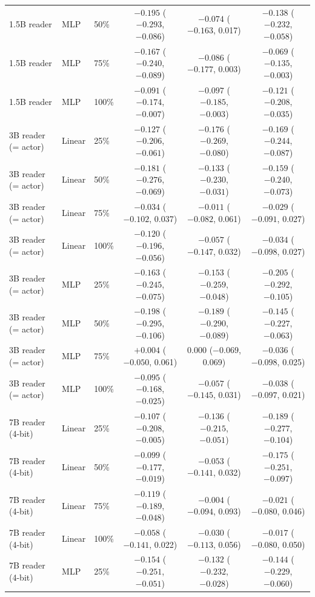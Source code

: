 \documentclass[11pt]{article}
\begin{document}
\begin{table}[h]
\begin{tabular}{@{}lllccc@{}}
1.5B reader & MLP & 50\% & $-0.195$ ($-0.293$, $-0.086$) & $-0.074$ ($-0.163$, 0.017) & $-0.138$ ($-0.232$, $-0.058$) \\
1.5B reader & MLP & 75\% & $-0.167$ ($-0.240$, $-0.089$) & $-0.086$ ($-0.177$, 0.003) & $-0.069$ ($-0.135$, $-0.003$) \\
1.5B reader & MLP & 100\% & $-0.091$ ($-0.174$, $-0.007$) & $-0.097$ ($-0.185$, $-0.003$) & $-0.121$ ($-0.208$, $-0.035$) \\
3B reader (= actor) & Linear & 25\% & $-0.127$ ($-0.206$, $-0.061$) & $-0.176$ ($-0.269$, $-0.080$) & $-0.169$ ($-0.244$, $-0.087$) \\
3B reader (= actor) & Linear & 50\% & $-0.181$ ($-0.276$, $-0.069$) & $-0.133$ ($-0.230$, $-0.031$) & $-0.159$ ($-0.240$, $-0.073$) \\
3B reader (= actor) & Linear & 75\% & $-0.034$ ($-0.102$, 0.037) & $-0.011$ ($-0.082$, 0.061) & $-0.029$ ($-0.091$, 0.027) \\
3B reader (= actor) & Linear & 100\% & $-0.120$ ($-0.196$, $-0.056$) & $-0.057$ ($-0.147$, 0.032) & $-0.034$ ($-0.098$, 0.027) \\
3B reader (= actor) & MLP & 25\% & $-0.163$ ($-0.245$, $-0.075$) & $-0.153$ ($-0.259$, $-0.048$) & $-0.205$ ($-0.292$, $-0.105$) \\
3B reader (= actor) & MLP & 50\% & $-0.198$ ($-0.295$, $-0.106$) & $-0.189$ ($-0.290$, $-0.089$) & $-0.145$ ($-0.227$, $-0.063$) \\
3B reader (= actor) & MLP & 75\% & $+0.004$ ($-0.050$, 0.061) & 0.000 ($-0.069$, 0.069) & $-0.036$ ($-0.098$, 0.025) \\
3B reader (= actor) & MLP & 100\% & $-0.095$ ($-0.168$, $-0.025$) & $-0.057$ ($-0.145$, 0.031) & $-0.038$ ($-0.097$, 0.021) \\
7B reader (4-bit) & Linear & 25\% & $-0.107$ ($-0.208$, $-0.005$) & $-0.136$ ($-0.215$, $-0.051$) & $-0.189$ ($-0.277$, $-0.104$) \\
7B reader (4-bit) & Linear & 50\% & $-0.099$ ($-0.177$, $-0.019$) & $-0.053$ ($-0.141$, 0.032) & $-0.175$ ($-0.251$, $-0.097$) \\
7B reader (4-bit) & Linear & 75\% & $-0.119$ ($-0.189$, $-0.048$) & $-0.004$ ($-0.094$, 0.093) & $-0.021$ ($-0.080$, 0.046) \\
7B reader (4-bit) & Linear & 100\% & $-0.058$ ($-0.141$, 0.022) & $-0.030$ ($-0.113$, 0.056) & $-0.017$ ($-0.080$, 0.050) \\
7B reader (4-bit) & MLP & 25\% & $-0.154$ ($-0.251$, $-0.051$) & $-0.132$ ($-0.232$, $-0.028$) & $-0.144$ ($-0.229$, $-0.060$) \\

\end{tabular}
\end{table}
\end{document}
